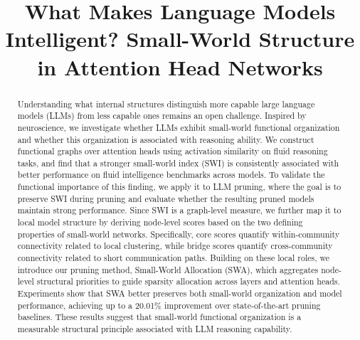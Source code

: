 \documentclass{article}
\title{	
What Makes Language Models Intelligent? Small-World Structure in Attention Head Networks}
\author{ }
\begin{document}
\maketitle


\begin{abstract}

Understanding what internal structures distinguish more capable large language models (LLMs) from less capable ones remains an open challenge. Inspired by neuroscience, we investigate whether LLMs exhibit small-world functional organization and whether this organization is associated with reasoning ability. We construct functional graphs over attention heads using activation similarity on fluid reasoning tasks, and find that a stronger small-world index (SWI) is consistently associated with better performance on fluid intelligence benchmarks across models. To validate the functional importance of this finding, we apply it to LLM pruning, where the goal is to preserve SWI during pruning and evaluate whether the resulting pruned models maintain strong performance. Since SWI is a graph-level measure, we further map it to local model structure by deriving node-level scores based on the two defining properties of small-world networks. Specifically, core scores quantify within-community connectivity related to local clustering, while bridge scores quantify cross-community connectivity related to short communication paths. Building on these local roles, we introduce our pruning method, Small-World Allocation (SWA), which aggregates node-level structural priorities to guide sparsity allocation across layers and attention heads. Experiments show that SWA better preserves both small-world organization and model performance, achieving up to a 20.01\% improvement over state-of-the-art pruning baselines. These results suggest that small-world functional organization is a measurable structural principle associated with LLM reasoning capability.
\end{abstract}













  
\medskip



\newpage

\end{document}
